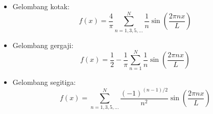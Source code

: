 \documentclass[a4paper,11pt,bahasa]{article} %
\begin{document}
\begin{itemize}
%
\item Gelombang kotak:
\begin{equation*}
f(x) = \frac{4}{\pi} \sum_{n=1,3,5,\ldots}^{N} \frac{1}{n}\sin\left(
\frac{2\pi n x}{L}
\right)
\end{equation*}
%
\item Gelombang gergaji:
\begin{equation*}
f(x) = \frac{1}{2} - \frac{1}{\pi} \sum_{n=1}^{N} \frac{1}{n}\sin\left(
\frac{2 \pi n  x}{L} \right)
\end{equation*}
%
\item Gelombang segitiga:
\begin{equation*}
f(x) = \sum_{n=1,3,5,\ldots}^{N} \frac{(-1)^{(n-1)/2}}{n^2}
\sin\left( \frac{2\pi n x}{L} \right)
\end{equation*}
%
\end{itemize}
\end{document}
